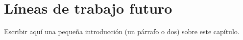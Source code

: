\chapter{Líneas de trabajo futuro}
\label{chap:08future}

Escribir aquí una pequeña introducción (un párrafo o dos) sobre este capítulo.
